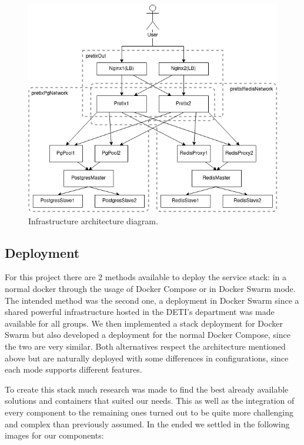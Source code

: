 \documentclass[12pt]{article}
\begin{document}
\begin{figure}[!h]
  \centering
  \begin{minipage}{.85\textwidth}
    \centering
    \includegraphics[width=\linewidth]{diagrams/InfrastructureArchitecture.png}
  \end{minipage}%
  \caption{Infrastructure architecture diagram.}
  \label{fig:InfrastructureArchitecture}
\end{figure} 


\subsection{Deployment} \label{strategy.deployment} %


For this project there are 2 methods available to deploy the service stack: in a normal docker through the usage of Docker Compose or in Docker Swarm mode. The intended method was the second one, a deployment in Docker Swarm since a shared powerful infrastructure hosted in the DETI's department was made available for all groups. We then implemented a stack deployment for Docker Swarm but also developed a deployment for the normal Docker Compose, since the two are very similar. Both alternatives respect the architecture mentioned above but are naturally deployed with some differences in configurations, since each mode supports different features.

To create this stack much research was made to find the best already available solutions and containers that suited our needs. This as well as the integration of every component to the remaining ones turned out to be quite more challenging and complex than previously assumed. In the ended we settled in the following images for our components:
\end{document}
